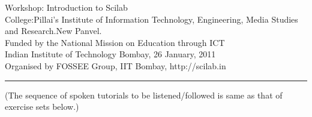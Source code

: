 \documentclass[12pt,a4paper]{article}
\begin{document}
\begin{center}
{\Large Workshop: Introduction to Scilab}
\\
\vspace{5pt}
{\large College:Pillai's Institute of Information Technology, Engineering, Media Studies and Research.New Panvel.}
 \\
 \vspace{5pt}
{\large Funded by the National Mission on Education through ICT}
\\
Indian Institute of Technology Bombay, 
26 January, 2011\\ 
Organised by FOSSEE Group, IIT Bombay, http://scilab.in
\\
\rule{\linewidth}{1pt}
(The sequence of spoken tutorials to be listened/followed is same as that of exercise sets below.)
\end{center}
\end{document}
